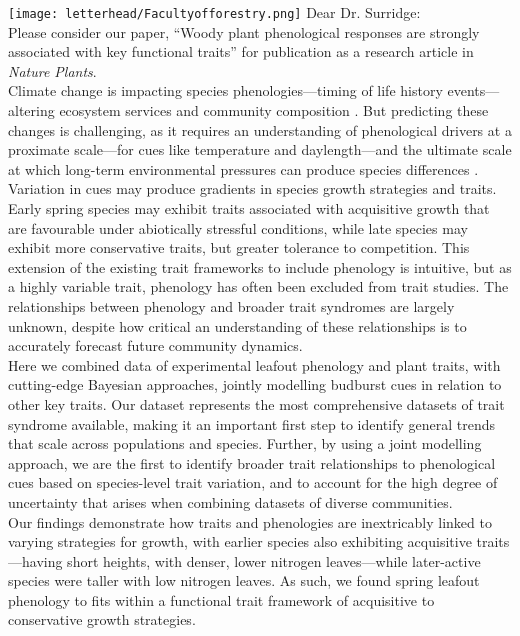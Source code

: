 \documentclass[11pt,a4paper]{article}
\begin{document}

\noindent \texttt{[image: letterhead/Facultyofforestry.png]}
\noindent Dear Dr. Surridge:
\vspace{1.5ex}\\
\noindent Please consider our paper, ``Woody plant phenological responses are strongly associated with key functional traits'' for publication as a research article in \emph{Nature Plants}. 
\vspace{1.5ex}\\ 
\noindent Climate change is impacting species phenologies---timing of life history events---altering ecosystem services and community composition \citep{Cleland2007a,Beard2019,Gu2022}. But predicting these changes is challenging, as it requires an understanding of phenological drivers at a proximate scale---for cues like temperature and daylength---and the ultimate scale at which long-term environmental pressures can produce species differences \citep{Ovaskainen2013,Wolkovich2021}.  Variation in cues may produce gradients in species growth strategies and traits. Early spring species may exhibit traits associated with acquisitive growth that are favourable under abiotically stressful conditions, while late species may exhibit more conservative traits, but greater tolerance to competition. This extension of the existing trait frameworks to include phenology is intuitive, but as a highly variable trait, phenology has often been excluded from trait studies. The relationships between phenology and broader trait syndromes are largely unknown, despite how critical an understanding of these relationships is to accurately forecast future community dynamics.
\vspace{1.5ex}\\
\noindent Here we combined data of experimental leafout phenology and plant traits, with cutting-edge Bayesian approaches, jointly modelling budburst cues in relation to other key traits. Our dataset represents the most comprehensive datasets of trait syndrome available, making it an important first step to identify general trends that scale across populations and species. Further, by using a joint modelling approach, we are the first to identify broader trait relationships to phenological cues based on species-level trait variation, and to account for the high degree of uncertainty that arises when combining datasets of diverse communities.
\vspace{1.5ex}\\
\noindent  Our findings demonstrate how traits and phenologies are inextricably linked to varying strategies for growth, with earlier species also exhibiting acquisitive traits---having short heights, with denser, lower nitrogen leaves---while later-active species were taller with low nitrogen leaves. As such, we found spring leafout phenology to fits within a functional trait framework of acquisitive to conservative growth strategies.
\end{document}
